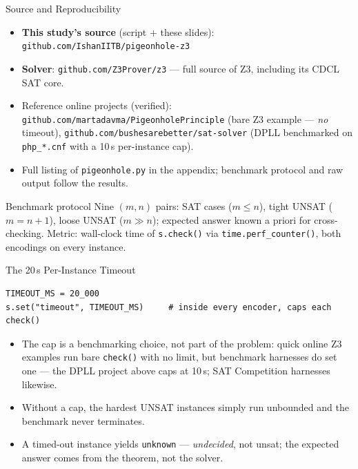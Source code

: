 \documentclass[10pt,aspectratio=169,xcolor={table}]{beamer}
\begin{document}
\begin{frame}[fragile]{Source and Reproducibility}
  \begin{itemize}\itemsep2pt
    \item \textbf{This study's source} (script + these slides):
          \\ \texttt{github.com/IshanIITB/pigeonhole-z3}
    \item \textbf{Solver}: \texttt{github.com/Z3Prover/z3} ---
          full source of Z3, including its CDCL SAT core.
    \item Reference online projects (verified):
          \texttt{github.com/martadavma/PigeonholePrinciple}
          (bare Z3 example --- \emph{no} timeout),
          \texttt{github.com/bushesarebetter/sat-solver}
          (DPLL benchmarked on \texttt{php\_*.cnf} with a 10\,s
          per-instance cap).
    \item Full listing of \texttt{pigeonhole.py} in the appendix;
          benchmark protocol and raw output follow the results.
  \end{itemize}
  \begin{block}{Benchmark protocol}
    Nine $(m,n)$ pairs: SAT cases ($m\le n$), tight UNSAT
    ($m=n+1$), loose UNSAT ($m\gg n$); expected answer known
    a priori for cross-checking. Metric: wall-clock time of
    \texttt{s.check()} via \texttt{time.perf\_counter()}, both
    encodings on every instance.
  \end{block}
\end{frame}

\begin{frame}[fragile]{The 20\,s Per-Instance Timeout}
\begin{lstlisting}[style=py]
TIMEOUT_MS = 20_000
s.set("timeout", TIMEOUT_MS)     # inside every encoder, caps each check()
\end{lstlisting}
  \begin{itemize}\itemsep2pt
    \item \alert{The cap is a benchmarking choice, not part of the
          problem}: quick online Z3 examples run bare
          \texttt{check()} with no limit, but benchmark harnesses
          do set one --- the DPLL project above caps at 10\,s;
          SAT Competition harnesses likewise.
    \item Without a cap, the hardest UNSAT instances simply run
          unbounded and the benchmark never terminates.
    \item A timed-out instance yields \texttt{unknown} ---
          \emph{undecided}, not unsat; the expected answer comes
          from the theorem, not the solver.
  \end{itemize}
\end{frame}
\end{document}
